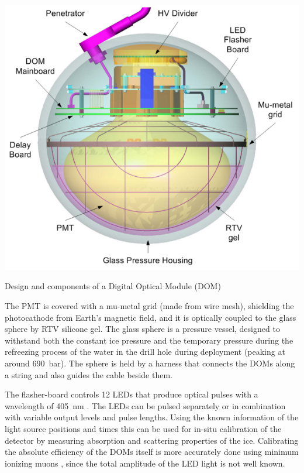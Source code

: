 \begin{marginfigure}
    \includegraphics{figures/icecube_deepcore/DOM_schematic.png}
	\caption[Digital Optical Module (DOM)]{Design and components of a Digital Optical Module (DOM) \cite{ABBASI2009294_data_acquisition}}
\end{marginfigure}

The PMT is covered with a mu-metal grid (made from wire mesh), shielding the photocathode from Earth's magnetic field, and it is optically coupled to the glass sphere by RTV silicone gel. The glass sphere is a pressure vessel, designed to withstand both the constant ice pressure and the temporary pressure during the refreezing process of the water in the drill hole during deployment (peaking at around \SI{690}{\bar}). The sphere is held by a harness that connects the DOMs along a string and also guides the cable beside them.

The flasher-board controls 12 LEDs that produce optical pulses with a wavelength of \SI{405}{\nano\meter} . The LEDs can be pulsed separately or in combination with variable output levels and pulse lengths. Using the known information of the light source positions and times this can be used for in-situ calibration of the detector by measuring absorption and scattering properties of the ice. Calibrating the absolute efficiency of the DOMs itself is more accurately done using minimum ionizing muons , since the total amplitude of the LED light is not well known.


